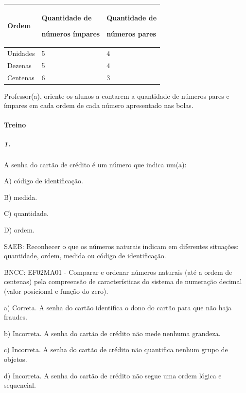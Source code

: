 \begin{longtable}[]{@{}lll@{}}
\toprule
\begin{minipage}[b]{0.32\columnwidth}\raggedright\strut
Ordem\strut
\end{minipage} & \begin{minipage}[b]{0.32\columnwidth}\raggedright\strut
Quantidade de

números ímpares\strut
\end{minipage} & \begin{minipage}[b]{0.32\columnwidth}\raggedright\strut
Quantidade de

números pares\strut
\end{minipage}\tabularnewline
\midrule
\endhead
Unidades & 5 & 4\tabularnewline
Dezenas & 5 & 4\tabularnewline
Centenas & 6 & 3\tabularnewline
\bottomrule
\end{longtable}

Professor(a), oriente os alunos a contarem a quantidade de números pares
e ímpares em cada ordem de cada número apresentado nas bolas.

\paragraph{Treino}\label{treino}

\subparagraph{1.}\label{section-11}

A senha do cartão de crédito é um número que indica um(a):

A) código de identificação.

B) medida.

C) quantidade.

D) ordem.

SAEB: Reconhecer o que os números naturais indicam em diferentes
situações: quantidade, ordem, medida ou código de identificação.

BNCC: EF02MA01 - Comparar e ordenar números naturais (até a ordem de
centenas) pela compreensão de características do sistema de numeração decimal (valor
posicional e função do zero).

a) Correta. A senha do cartão identifica o dono do cartão para que não
haja fraudes.

b) Incorreta. A senha do cartão de crédito não mede nenhuma grandeza.

c) Incorreta. A senha do cartão de crédito não quantifica nenhum grupo de objetos.

d) Incorreta. A senha do cartão de crédito não segue uma ordem lógica e sequencial.

